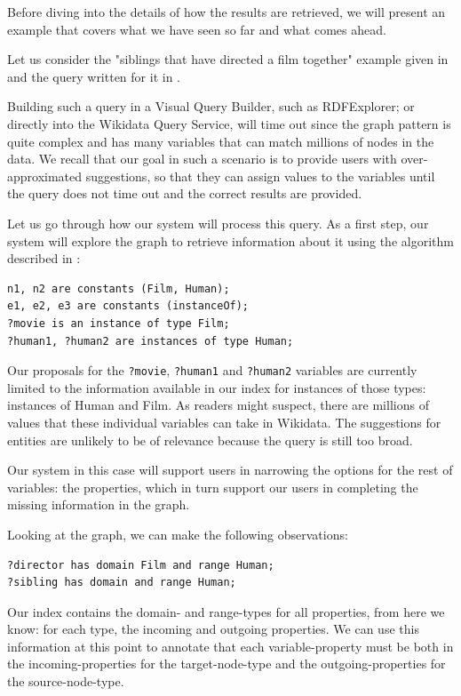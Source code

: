 Before diving into the details of how the results are retrieved, we will present an example that covers what we have seen so far and what comes ahead.

\begin{example}

Let us consider the "siblings that have directed a film together" example given in  and the query written for it in .

Building such a query in a Visual Query Builder, such as RDFExplorer; or directly into the Wikidata Query Service, will time out since the graph pattern is quite complex and has many variables that can match millions of nodes in the data. We recall that our goal in such a scenario is to provide users with over-approximated suggestions, so that they can assign values to the variables until the query does not time out and the correct results are provided.

Let us go through how our system will process this query. 
As a first step, our system will explore the graph to retrieve information about it using the algorithm described in :
\begin{verbatim}
n1, n2 are constants (Film, Human);
e1, e2, e3 are constants (instanceOf);
?movie is an instance of type Film;
?human1, ?human2 are instances of type Human;
\end{verbatim}

Our proposals for the \texttt{?movie}, \texttt{?human1} and \texttt{?human2} variables are currently limited to the information available in our index for instances of those types: instances of Human and Film. As readers might suspect, there are millions of values that these individual variables can take in Wikidata. The suggestions for entities are unlikely to be of relevance because the query is still too broad.

Our system in this case will support users in narrowing the options for the rest of variables: the properties, which in turn support our users in completing the missing information in the graph.

Looking at the graph, we can make the following observations:
\begin{verbatim}
?director has domain Film and range Human;
?sibling has domain and range Human;
\end{verbatim}

Our index contains the domain- and range-types for all properties, from here we know: for each type, the incoming and outgoing properties. 
We can use this information at this point to annotate that each variable-property must be both in the incoming-properties for the target-node-type and the outgoing-properties for the source-node-type.


\end{example}

